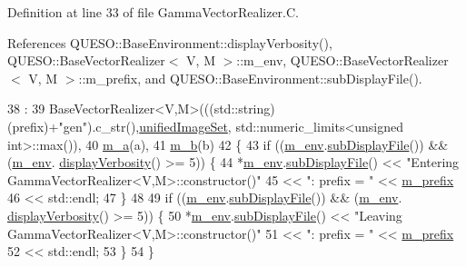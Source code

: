 Definition at line 33 of file Gamma\-Vector\-Realizer.\-C.



References Q\-U\-E\-S\-O\-::\-Base\-Environment\-::display\-Verbosity(), Q\-U\-E\-S\-O\-::\-Base\-Vector\-Realizer$<$ V, M $>$\-::m\-\_\-env, Q\-U\-E\-S\-O\-::\-Base\-Vector\-Realizer$<$ V, M $>$\-::m\-\_\-prefix, and Q\-U\-E\-S\-O\-::\-Base\-Environment\-::sub\-Display\-File().


\begin{DoxyCode}
38   :
39   BaseVectorRealizer<V,M>(((std::string)(prefix)+\textcolor{stringliteral}{"gen"}).c\_str(),\hyperlink{class_q_u_e_s_o_1_1_base_vector_realizer_ad958991bab8d6369e8a0d66b22a237d4}{unifiedImageSet},
      std::numeric\_limits<unsigned int>::max()),
40   \hyperlink{class_q_u_e_s_o_1_1_gamma_vector_realizer_a536756e884d641240015451f2f7a759c}{m\_a}(a),
41   \hyperlink{class_q_u_e_s_o_1_1_gamma_vector_realizer_a55e4d4fe511a6d63eaa98d6d6a7aaac5}{m\_b}(b)
42 \{
43   \textcolor{keywordflow}{if} ((\hyperlink{class_q_u_e_s_o_1_1_base_vector_realizer_acde246c52f82d8ed687d91cfac14c29c}{m\_env}.\hyperlink{class_q_u_e_s_o_1_1_base_environment_a8a0064746ae8dddfece4229b9ad374d6}{subDisplayFile}()) && (\hyperlink{class_q_u_e_s_o_1_1_base_vector_realizer_acde246c52f82d8ed687d91cfac14c29c}{m\_env}.
      \hyperlink{class_q_u_e_s_o_1_1_base_environment_a1fe5f244fc0316a0ab3e37463f108b96}{displayVerbosity}() >= 5)) \{
44     *\hyperlink{class_q_u_e_s_o_1_1_base_vector_realizer_acde246c52f82d8ed687d91cfac14c29c}{m\_env}.\hyperlink{class_q_u_e_s_o_1_1_base_environment_a8a0064746ae8dddfece4229b9ad374d6}{subDisplayFile}() << \textcolor{stringliteral}{"Entering GammaVectorRealizer<V,M>::constructor()"}
45                             << \textcolor{stringliteral}{": prefix = "} << \hyperlink{class_q_u_e_s_o_1_1_base_vector_realizer_ac5559b6921816ccaed7afc2d342c2a32}{m\_prefix}
46                             << std::endl;
47   \}
48 
49   \textcolor{keywordflow}{if} ((\hyperlink{class_q_u_e_s_o_1_1_base_vector_realizer_acde246c52f82d8ed687d91cfac14c29c}{m\_env}.\hyperlink{class_q_u_e_s_o_1_1_base_environment_a8a0064746ae8dddfece4229b9ad374d6}{subDisplayFile}()) && (\hyperlink{class_q_u_e_s_o_1_1_base_vector_realizer_acde246c52f82d8ed687d91cfac14c29c}{m\_env}.
      \hyperlink{class_q_u_e_s_o_1_1_base_environment_a1fe5f244fc0316a0ab3e37463f108b96}{displayVerbosity}() >= 5)) \{
50     *\hyperlink{class_q_u_e_s_o_1_1_base_vector_realizer_acde246c52f82d8ed687d91cfac14c29c}{m\_env}.\hyperlink{class_q_u_e_s_o_1_1_base_environment_a8a0064746ae8dddfece4229b9ad374d6}{subDisplayFile}() << \textcolor{stringliteral}{"Leaving GammaVectorRealizer<V,M>::constructor()"}
51                             << \textcolor{stringliteral}{": prefix = "} << \hyperlink{class_q_u_e_s_o_1_1_base_vector_realizer_ac5559b6921816ccaed7afc2d342c2a32}{m\_prefix}
52                             << std::endl;
53   \}
54 \}
\end{DoxyCode}
